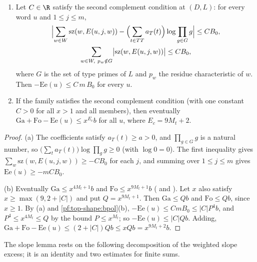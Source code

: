 \begin{lemma}\label{pf:top-shape:gauge}
\begin{enumerate}[label=(\alph*)]
\item Let $C\in\R$ satisfy the second complement condition at $(D,L)$: for every word $u$ and $1\le j\le m$,
\begin{gather*}
\Bigl|\sum_{w\in W}\mathrm{sz}(w,E(u,j,w))-\Bigl(\sum_{t\in TT}a_T(t)\Bigr)\log\prod_{g\in G}g\Bigr|\le CB_0,\\
\sum_{w\in W,\ p_w\notin G}\bigl|\mathrm{sz}(w,E(u,j,w))\bigr|\le CB_0,
\end{gather*}
where $G$ is the set of type primes of $L$ and $p_w$ the residue characteristic of $w$. Then $-\mathrm{Ee}(u)\le
C\,m\,B_0$ for every $u$.
\item If the family satisfies the second complement condition (with one constant $C>0$ for all $x>1$ and all
members), then eventually $\mathrm{Ga}+\mathrm{Fo}-\mathrm{Ee}(u)\le x^{E_c}b$ for all $u$, where $E_c=9M_t+2$.
\end{enumerate}
\end{lemma}

\begin{proof}
(a) The coefficients satisfy $a_T(t)\ge a>0$, and $\prod_{g\in G}g$ is a natural number,
so $\bigl(\sum_ta_T(t)\bigr)\log\prod_gg\ge0$ (with $\log0=0$). The first inequality gives
$\sum_w\mathrm{sz}(w,E(u,j,w))\ge-CB_0$ for each $j$, and summing over $1\le j\le m$ gives $\mathrm{Ee}(u)\ge-mCB_0$.

(b) Eventually $\mathrm{Ga}\le x^{4M_t+1}b$ and $\mathrm{Fo}\le x^{9M_t+1}b$
( and ).
Let $x$ also satisfy $x\ge\max(9,2+|C|)$ and put $Q=x^{9M_t+1}$. Then $\mathrm{Ga}\le Qb$ and $\mathrm{Fo}\le Qb$, since
$x\ge1$. By (a) and \cref{pf:top-shape:bpol}(b), $-\mathrm{Ee}(u)\le CmB_0\le|C|P^4b$, and $P^4\le x^{4M_t}\le Q$ by the
bound $P\le x^{M_t}$; so $-\mathrm{Ee}(u)\le|C|Qb$. Adding,
$\mathrm{Ga}+\mathrm{Fo}-\mathrm{Ee}(u)\le(2+|C|)Qb\le xQb=x^{9M_t+2}b$.
\end{proof}

The slope lemma rests on the following decomposition of the weighted slope excess; it is an identity and two
estimates for finite sums.

